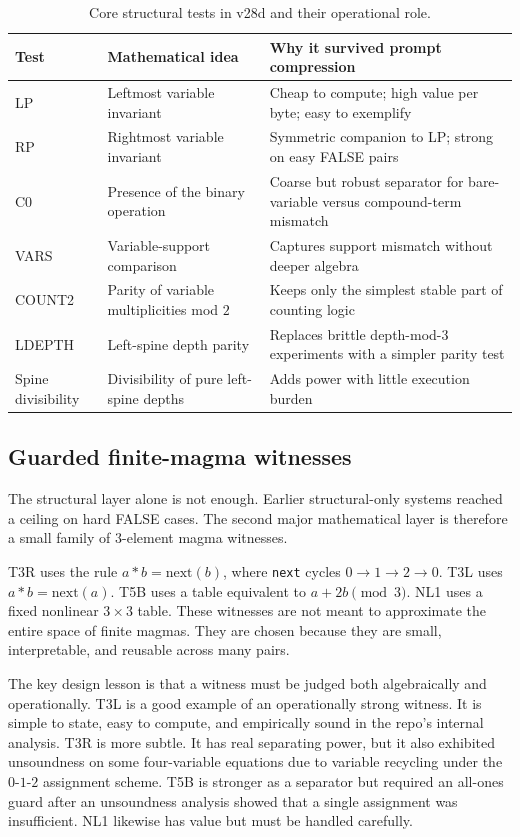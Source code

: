\documentclass[12pt]{amsart}
\begin{document}
\begin{table}[t]
\centering
\caption{Core structural tests in v28d and their operational role.}
\begin{tabular}{>{\raggedright\arraybackslash}p{1.3in} >{\raggedright\arraybackslash}p{1.9in} >{\raggedright\arraybackslash}p{2.5in}}
\toprule
Test & Mathematical idea & Why it survived prompt compression \\
\midrule
LP & Leftmost variable invariant & Cheap to compute; high value per byte; easy to exemplify \\
RP & Rightmost variable invariant & Symmetric companion to LP; strong on easy FALSE pairs \\
C0 & Presence of the binary operation & Coarse but robust separator for bare-variable versus compound-term mismatch \\
VARS & Variable-support comparison & Captures support mismatch without deeper algebra \\
COUNT2 & Parity of variable multiplicities mod $2$ & Keeps only the simplest stable part of counting logic \\
LDEPTH & Left-spine depth parity & Replaces brittle depth-mod-$3$ experiments with a simpler parity test \\
Spine divisibility & Divisibility of pure left-spine depths & Adds power with little execution burden \\
\bottomrule
\end{tabular}
\end{table}

\subsection{Guarded finite-magma witnesses}

The structural layer alone is not enough. Earlier structural-only systems reached a ceiling on hard FALSE cases. The second major mathematical layer is therefore a small family of $3$-element magma witnesses.

T3R uses the rule $a * b = \mathrm{next}(b)$, where \texttt{next} cycles $0 \to 1 \to 2 \to 0$. T3L uses $a * b = \mathrm{next}(a)$. T5B uses a table equivalent to $a + 2b \pmod 3$. NL1 uses a fixed nonlinear $3 \times 3$ table. These witnesses are not meant to approximate the entire space of finite magmas. They are chosen because they are small, interpretable, and reusable across many pairs.

The key design lesson is that a witness must be judged both algebraically and operationally. T3L is a good example of an operationally strong witness. It is simple to state, easy to compute, and empirically sound in the repo's internal analysis. T3R is more subtle. It has real separating power, but it also exhibited unsoundness on some four-variable equations due to variable recycling under the $0$-$1$-$2$ assignment scheme. T5B is stronger as a separator but required an all-ones guard after an unsoundness analysis showed that a single assignment was insufficient. NL1 likewise has value but must be handled carefully.
\end{document}
